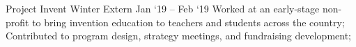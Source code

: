 \experience
    {Project Invent}
    {Winter Extern}
    {Jan `19 -- Feb `19}
    {
        Worked at an early-stage non-profit to bring invention education to teachers and students
        across the country;
        Contributed to program design, strategy meetings, and fundraising development;
    } 
